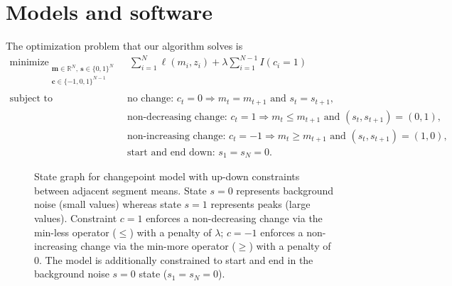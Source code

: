 \documentclass[article]{jss}
\DeclareMathOperator*{\minimize}{minimize}
\newcommand{\RR}{\mathbb R}
\begin{document}
\section{Models and software} \label{sec:models}

The optimization problem that our algorithm solves is
\begin{align*}
  \label{eq:penalized_peakseg}
  \minimize_{
  \substack{
  \mathbf m\in\RR^N,\ \mathbf s\in\{0, 1\}^N\\
  \mathbf c\in\{-1, 0,1\}^{N-1}\\
  }
  } &\ \ 
      \sum_{i=1}^N \ell(m_i, z_i) + \lambda \sum_{i=1}^{N-1} I(c_i = 1) \\
  \text{subject to\ \ \ } &\ \text{no change: }c_t = 0 \Rightarrow m_t = m_{t+1}\text{ and }s_t=s_{t+1}, \\
    &\ \text{non-decreasing change: }c_t = 1 \Rightarrow m_t \leq m_{t+1}\text{ and }(s_t,s_{t+1})=(0,1),\\
    &\ \text{non-increasing change: } c_t = -1 \Rightarrow m_t \geq m_{t+1}\text{ and }(s_t,s_{t+1})=(1,0),\\
  & \ \text{start and end down: } s_1=s_N=0.
\end{align*}

\begin{figure}
  \centering
  \caption{State graph for changepoint model with up-down constraints
    between adjacent segment means. State $s=0$ represents background
    noise (small values) whereas state $s=1$ represents peaks (large
    values). Constraint $c=1$ enforces a non-decreasing change via the
    min-less operator ($\leq$) with a penalty of $\lambda$; $c=-1$
    enforces a non-increasing change via the min-more operator
    ($\geq$) with a penalty of $0$. The model is additionally
    constrained to start and end in the background noise $s=0$ state
    ($s_1=s_N=0$).}
  \label{fig:state-graph}
\end{figure}
\end{document}
